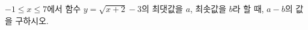 \hspace*{2mm}\begin{minipage}[t]{\dimexpr\linewidth-2mm\relax}\vspace{0pt}
$-1\le x\le 7$에서 함수 $y=\sqrt{x+2}-3$의 최댓값을 $a$, 최솟값을 $b$라 할 때, $a-b$의 값을 구하시오.\end{minipage}
